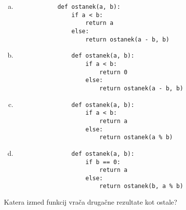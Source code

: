 \documentclass[arhiv, 10pt]{../izpit}
\begin{document}
        \begin{multicols}{2}
        \begin{enumerate}[(a)]
\item 
            \begin{verbatim}
            def ostanek(a, b):
                if a < b:
                    return a
                else:
                    return ostanek(a - b, b)
            \end{verbatim}
        
\item 
                \begin{verbatim}
                def ostanek(a, b):
                    if a < b:
                        return 0
                    else:
                        return ostanek(a - b, b)
                \end{verbatim}
            
\item 
                \begin{verbatim}
                def ostanek(a, b):
                    if a < b:
                        return a
                    else:
                        return ostanek(a % b)
                \end{verbatim}
            
\item 
                \begin{verbatim}
                def ostanek(a, b):
                    if b == 0:
                        return a
                    else:
                        return ostanek(b, a % b)
                \end{verbatim}
            
\end{enumerate}

        \end{multicols}
    
        \naloga*
        
        Katera izmed funkcij vrača drugačne rezultate kot ostale?
    
\end{document}
